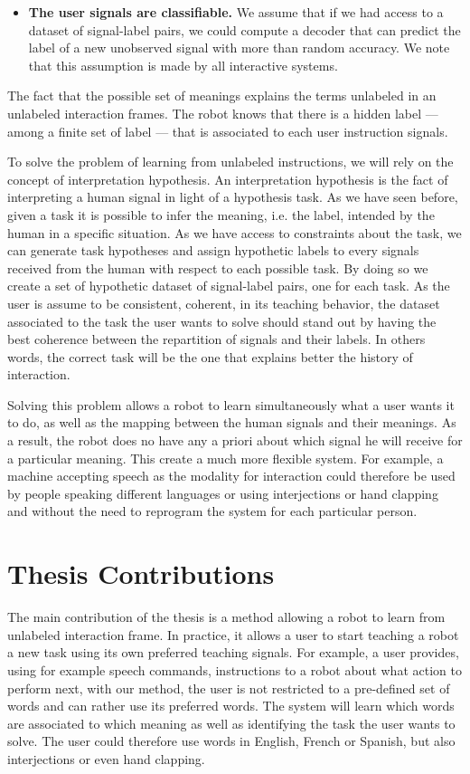 \begin{itemize}
\item \textbf{The user signals are classifiable.} We assume that if we had access to a dataset of signal-label pairs, we could compute a decoder that can predict the label of a new unobserved signal with more than random accuracy. We note that this assumption is made by all interactive systems.

\end{itemize}

The fact that the possible set of meanings explains the terms unlabeled in an unlabeled interaction frames. The robot knows that there is a hidden label --- among a finite set of label --- that is associated to each user instruction signals.

To solve the problem of learning from unlabeled instructions, we will rely on the concept of interpretation hypothesis. An interpretation hypothesis is the fact of interpreting a human signal in light of a hypothesis task. As we have seen before, given a task it is possible to infer the meaning, i.e. the label, intended by the human in a specific situation. As we have access to constraints about the task, we can generate task hypotheses and assign hypothetic labels to every signals received from the human with respect to each possible task. By doing so we create a set of hypothetic dataset of signal-label pairs, one for each task. As the user is assume to be consistent, coherent, in its teaching behavior, the dataset associated to the task the user wants to solve should stand out by having the best coherence between the repartition of signals and their labels. In others words, the correct task will be the one that explains better the history of interaction.

Solving this problem allows a robot to learn simultaneously what a user wants it to do, as well as the mapping between the human signals and their meanings. As a result, the robot does no have any a priori about which signal he will receive for a particular meaning. This create a much more flexible system. For example, a machine accepting speech as the modality for interaction could therefore be used by people speaking different languages or using interjections or hand clapping and without the need to reprogram the system for each particular person.

\section{Thesis Contributions}

The main contribution of the thesis is a method allowing a robot to learn from unlabeled interaction frame. In practice, it allows a user to start teaching a robot a new task using its own preferred teaching signals. For example, a user provides, using for example speech commands, instructions to a robot about what action to perform next, with our method, the user is not restricted to a pre-defined set of words and can rather use its preferred words. The system will learn which words are associated to which meaning as well as identifying the task the user wants to solve. The user could therefore use words in English, French or Spanish, but also interjections or even hand clapping.

